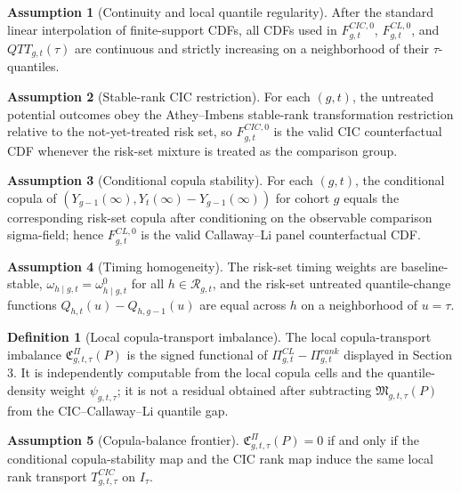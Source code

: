 \documentclass[11pt]{article}
\theoremstyle{definition}
\newtheorem{definition}{Definition}
\newtheorem{assumption}{Assumption}
\theoremstyle{plain}
\theoremstyle{remark}
\begin{document}
\begin{assumption}[Continuity and local quantile regularity]\label{ass:regularity}
After the standard linear interpolation of finite-support CDFs, all CDFs used in \(F^{CIC,0}_{g,t}\), \(F^{CL,0}_{g,t}\), and \(QTT_{g,t}(\tau)\) are continuous and strictly increasing on a neighborhood of their \(\tau\)-quantiles.
\end{assumption}

\begin{assumption}[Stable-rank CIC restriction]\label{ass:cic}
For each \((g,t)\), the untreated potential outcomes obey the Athey--Imbens stable-rank transformation restriction relative to the not-yet-treated risk set, so \(F^{CIC,0}_{g,t}\) is the valid CIC counterfactual CDF whenever the risk-set mixture is treated as the comparison group.
\end{assumption}

\begin{assumption}[Conditional copula stability]\label{ass:cl-copula}
For each \((g,t)\), the conditional copula of \((Y_{g-1}(\infty),Y_t(\infty)-Y_{g-1}(\infty))\) for cohort \(g\) equals the corresponding risk-set copula after conditioning on the observable comparison sigma-field; hence \(F^{CL,0}_{g,t}\) is the valid Callaway--Li panel counterfactual CDF.
\end{assumption}

\begin{assumption}[Timing homogeneity]\label{ass:timing-homogeneity}
The risk-set timing weights are baseline-stable, \(\omega_{h\mid g,t}=\omega^0_{h\mid g,t}\) for all \(h\in\mathcal R_{g,t}\), and the risk-set untreated quantile-change functions \(Q_{h,t}(u)-Q_{h,g-1}(u)\) are equal across \(h\) on a neighborhood of \(u=\tau\).
\end{assumption}

\begin{definition}[Local copula-transport imbalance]\label{def:copula-imbalance}
The local copula-transport imbalance \(\mathfrak C^{\Pi}_{g,t,\tau}(P)\) is the signed functional of \(\Pi^{CL}_{g,t}-\Pi^{rank}_{g,t}\) displayed in Section 3. It is independently computable from the local copula cells and the quantile-density weight \(\psi_{g,t,\tau}\); it is not a residual obtained after subtracting \(\mathfrak M_{g,t,\tau}(P)\) from the CIC--Callaway--Li quantile gap.
\end{definition}

\begin{assumption}[Copula-balance frontier]\label{ass:copula-balance}
\(\mathfrak C^{\Pi}_{g,t,\tau}(P)=0\) if and only if the conditional copula-stability map and the CIC rank map induce the same local rank transport \(T^{CIC}_{g,t,\tau}\) on \(I_\tau\).
\end{assumption}
\end{document}
